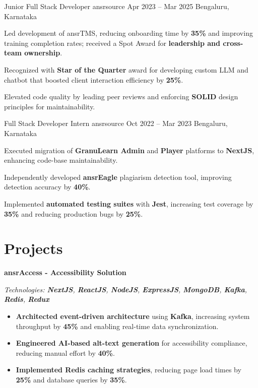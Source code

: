 \documentclass[letterpaper]{resume_config}
\begin{document}
\WorkExperience
    {Junior Full Stack Developer} %
    {ansrsource} %
    {Apr 2023 -- Mar 2025} %
    {Bengaluru, Karnataka} %
    {
      \item Led development of ansrTMS, reducing onboarding time by \textbf{35\%} and improving training completion rates; received a Spot Award for \textbf{leadership and cross-team ownership}.
        \item Recognized with \textbf{Star of the Quarter} award for developing custom LLM and chatbot that boosted client interaction efficiency by \textbf{25\%}.
        \item Elevated code quality by leading peer reviews and enforcing \textbf{SOLID} design principles for maintainability. 
    }

\WorkExperience
    {Full Stack Developer Intern} %
    {ansrsource} %
    {Oct 2022 -- Mar 2023} %
    {Bengaluru, Karnataka} %
    {
        \item Executed migration of \textbf{GranuLearn Admin} and \textbf{Player} platforms to \textbf{NextJS}, enhancing code-base maintainability.
        \item Independently developed \textbf{ansrEagle} plagiarism detection tool, improving detection accuracy by \textbf{40\%}.
        \item Implemented \textbf{automated testing suites} with \textbf{Jest}, increasing test coverage by \textbf{35\%} and reducing production bugs by \textbf{25\%}.
    }


\section{Projects}
\textbf{ansrAccess - Accessibility Solution}

 \textit{Technologies: \textbf{NextJS}, \textbf{ReactJS}, \textbf{NodeJS}, \textbf{ExpressJS}, \textbf{MongoDB}, \textbf{Kafka}, \textbf{Redis}, \textbf{Redux}}

\begin{itemize}
    \item \textbf{Architected event-driven architecture} using \textbf{Kafka}, increasing system throughput by \textbf{45\%} and enabling real-time data synchronization.
    \item \textbf{Engineered AI-based alt-text generation} for accessibility compliance, reducing manual effort by \textbf{40\%}.
    \item \textbf{Implemented Redis caching strategies}, reducing page load times by \textbf{25\%} and database queries by \textbf{35\%}.
\end{itemize}
\end{document}
